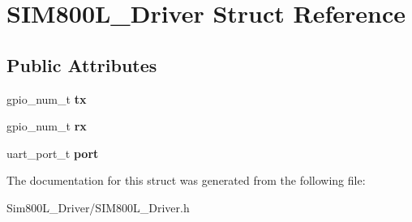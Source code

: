 \hypertarget{structSIM800L__Driver}{}\section{S\+I\+M800\+L\+\_\+\+Driver Struct Reference}
\label{structSIM800L__Driver}
\subsection*{Public Attributes}
\begin{DoxyCompactItemize}
\item 
\mbox{\label{structSIM800L__Driver_ad562f9593d1258b675ef1903d2d27e49}} 
gpio\+\_\+num\+\_\+t {\bfseries tx}
\item 
\mbox{\label{structSIM800L__Driver_a4a62b8582717ae3e175b5680be23974f}} 
gpio\+\_\+num\+\_\+t {\bfseries rx}
\item 
\mbox{\label{structSIM800L__Driver_a034225556bcf211f3a32a48280204068}} 
uart\+\_\+port\+\_\+t {\bfseries port}
\end{DoxyCompactItemize}


The documentation for this struct was generated from the following file\+:\begin{DoxyCompactItemize}
\item 
Sim800\+L\+\_\+\+Driver/S\+I\+M800\+L\+\_\+\+Driver.\+h\end{DoxyCompactItemize}

